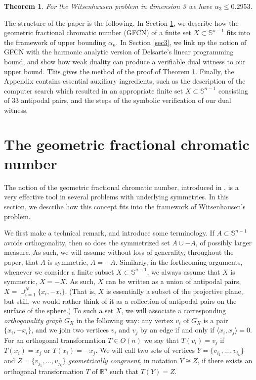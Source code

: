 \documentclass[11pt]{amsart}
\newtheorem{theorem}{Theorem}[section]
\numberwithin{equation}{section}
\newcommand{\Sp}{\mathbb S}
\newcommand{\R}{\mathbb R}
\begin{document}
\begin{theorem}\label{main}
For the Witsenhausen problem in dimension 3 we have $\alpha_3\le 0.2953$.
\end{theorem}

\medskip

The structure of the paper is the following. In Section \ref{sec2}, we describe how the geometric fractional chromatic number (GFCN) of a finite set $X\subset \Sp^{n-1}$ fits into the framework of upper bounding $\alpha_n$. In Section \ref{sec3}, we link up the notion of GFCN with the harmonic analytic version of Delsarte's linear programming bound, and show how weak duality can produce a verifiable dual witness to our upper bound. This gives the method of the proof of Theorem \ref{main}.  Finally, the Appendix contains essential auxiliary ingredients, such as the description of the computer search which resulted in an appropriate finite set $X\subset \Sp^{n-1}$ consisting of 33 antipodal pairs, and the steps of the symbolic verification of our dual witness.  


\section{The geometric fractional chromatic number}
\label{sec2}

The notion of the geometric fractional chromatic number, introduced in \cite{ambrus}, is a very effective tool in several problems with underlying  symmetries. In this section, we describe how this concept fits into the framework of Witsenhausen's problem. 

\medskip

We first make a technical remark, and introduce some terminology. If $A\subset \Sp^{n-1}$ avoids orthogonality, then so does the symmetrized set $A\cup -A$, of possibly larger measure. As such, we will assume without loss of generality, throughout the paper, that $A$ is symmetric, $A=-A$. Similarly, in the forthcoming arguments, whenever we consider a finite subset $X\subset \Sp^{n-1}$, we always assume that $X$ is symmetric, $X=-X$. As such, $X$ can be written as a union of antipodal pairs, $X=\cup_{i=1}^N \{x_i, -x_i\}$. (That is, $X$ is essentially a subset of the projective plane, but still, we would rather think of it as a collection of antipodal pairs on the surface of the sphere.) To such a set $X$, we will associate a corresponding {\it orthogonality graph} $G_X$ in the following way: any vertex $v_i$ of $G_X$ is a pair $\{x_i, -x_i\}$, and we join two vertices $v_i$ and $v_j$  by an edge if and only if $\langle x_i, x_j \rangle =0$. For an orthogonal transformation $T\in O(n)$ we say that $T(v_i)=v_j$ if $T(x_i)=x_j$ or $T(x_i)=-x_j$. We will call two sets of vertices $Y=\{v_{i_1}, \dots, v_{i_k}\}$ and $Z=\{v_{j_1}, \dots, v_{j_k}\}$ {\it geometrically congruent}, in notation $Y\cong Z$, if there exists an orthogonal transformation $T$ of $\R^n$ such that $T(Y)=Z$. 
\end{document}
